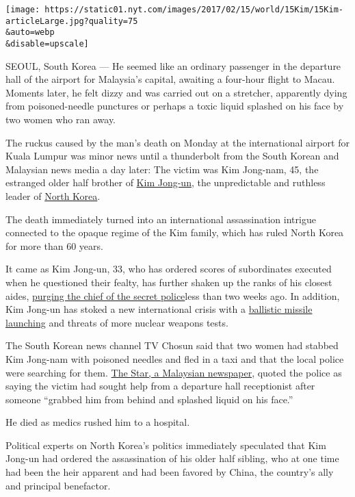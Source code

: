 \texttt{[image: https://static01.nyt.com/images/2017/02/15/world/15Kim/15Kim-articleLarge.jpg?quality=75\\\&auto=webp\\\&disable=upscale]}

SEOUL, South Korea --- He seemed like an ordinary passenger in the
departure hall of the airport for Malaysia's capital, awaiting a
four-hour flight to Macau. Moments later, he felt dizzy and was carried
out on a stretcher, apparently dying from poisoned-needle punctures or
perhaps a toxic liquid splashed on his face by two women who ran away.

The ruckus caused by the man's death on Monday at the international
airport for Kuala Lumpur was minor news until a thunderbolt from the
South Korean and Malaysian news media a day later: The victim was Kim
Jong-nam, 45, the estranged older half brother of
\href{https://www.nytimes.com/2017/01/25/world/asia/north-korea-defector.html}{Kim
Jong-un}, the unpredictable and ruthless leader of
\href{https://www.nytimes.com/topic/destination/north-korea?8qa}{North
Korea}.

The death immediately turned into an international assassination
intrigue connected to the opaque regime of the Kim family, which has
ruled North Korea for more than 60 years.

It came as Kim Jong-un, 33, who has ordered scores of subordinates
executed when he questioned their fealty, has further shaken up the
ranks of his closest aides,
\href{https://www.nytimes.com/2017/02/03/world/asia/north-korea-purge-kim-jong-un-kim-won-hong.html?_r=0}{purging
the chief of the secret police}less than two weeks ago. In addition, Kim
Jong-un has stoked a new international crisis with a
\href{https://www.nytimes.com/2017/02/13/world/asia/north-korea-missile-launch-success.html}{ballistic
missile launching} and threats of more nuclear weapons tests.

The South Korean news channel TV Chosun said that two women had stabbed
Kim Jong-nam with poisoned needles and fled in a taxi and that the local
police were searching for them.
\href{http://www.thestar.com.my/news/nation/2017/02/14/police-confirm-kim-jong-nam-killed-at-klia/}{The
Star, a Malaysian newspaper}, quoted the police as saying the victim had
sought help from a departure hall receptionist after someone ``grabbed
him from behind and splashed liquid on his face.''

He died as medics rushed him to a hospital.

Political experts on North Korea's politics immediately speculated that
Kim Jong-un had ordered the assassination of his older half sibling, who
at one time had been the heir apparent and had been favored by China,
the country's ally and principal benefactor.

